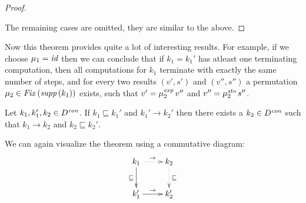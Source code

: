 \documentclass[12pt,a4paper]{report}
\newcommand{\scon}{\nstyle{con}}
\newcommand{\sexp}{\nstyle{exp}}
\newcommand{\ssto}{\nstyle{sto}}
\newcommand{\id}{\nstyle{id}}
\newcommand{\Fix}[1]{\nstyle{Fix}\,(#1)}
\begin{document}
\begin{proof}
\begin{itemize}
  \end{itemize}
  The remaining cases are omitted, they are similar to the above. 
\end{proof}

Now this theorem provides quite a lot of interesting results. For example, if we choose $\mu_1 = \id$ then we can
conclude that if $k_1 = k_1'$ has atleast one terminating computation, then all computations for $k_1$ terminate
with exactly the same number of steps, and for every two results $(v',s')$ and $(v'',s'')$ a permutation
$\mu_2 \in \Fix{\supp{k_1}}$ exists, such that $v' = \mu_2^\sexp\,v''$ and $v'' = \mu_2^\ssto\,s''$.

\begin{theorem} \label{theorem:small_steps_and_graph}
  Let $k_1,k_1',k_2\in D^\scon$. If $k_1 \sqsubseteq k_1'$ and $k_1' \to k_2'$ then
  there exists a $k_2 \in D^\scon$ such that $k_1 \to k_2$ and $k_2 \sqsubseteq k_2'$.
\end{theorem}

We can again visualize the theorem using a commutative diagram:
\[
  \xymatrix{
    k_1 \ar@{.>}[r]^{\to} \ar[d]_{\sqsubseteq} & k_2 \ar@{.>}[d]^{\sqsubseteq} \\
    k_1' \ar[r]^{\to} & k_2'
  }
\]
\end{document}
